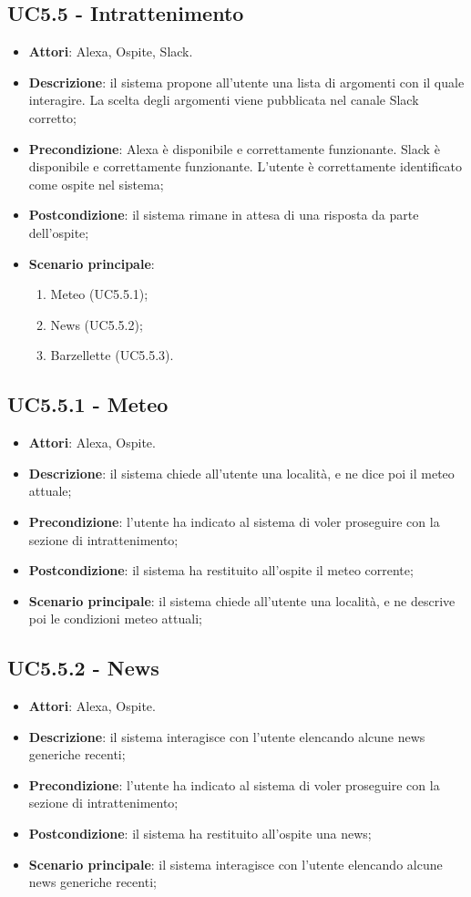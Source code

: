 \documentclass[../AnalisiDeiRequisiti_v3.0.0.tex]{subfiles}
\begin{document}
\subsection{UC5.5 - Intrattenimento} 
\label{sssec:UC5.5} 
\begin{itemize} 
\item \textbf{Attori}: Alexa, Ospite, Slack.
\item \textbf{Descrizione}: il sistema propone all'utente una lista di argomenti con il quale interagire. La scelta degli argomenti viene pubblicata nel canale Slack corretto;
\item \textbf{Precondizione}: Alexa è disponibile e correttamente funzionante. Slack è disponibile e correttamente funzionante. L'utente è correttamente identificato come ospite nel sistema;
\item \textbf{Postcondizione}: il sistema rimane in attesa di una risposta da parte dell'ospite;
\item \textbf{Scenario principale}: \begin{enumerate}\item Meteo (UC5.5.1);\item News (UC5.5.2);\item Barzellette (UC5.5.3). 
 \end{enumerate}
\end{itemize} 
\subsection{UC5.5.1 - Meteo} 
\label{sssec:UC5.5.1} 
\begin{itemize} 
\item \textbf{Attori}: Alexa, Ospite.
\item \textbf{Descrizione}: il sistema chiede all'utente una località, e ne dice poi il meteo attuale;
\item \textbf{Precondizione}: l'utente ha indicato al sistema di voler proseguire con la sezione di intrattenimento;
\item \textbf{Postcondizione}: il sistema ha restituito all'ospite il meteo corrente;
\item \textbf{Scenario principale}: il sistema chiede all'utente una località, e ne descrive poi le condizioni meteo attuali;
\end{itemize} 
\subsection{UC5.5.2 - News} 
\label{sssec:UC5.5.2} 
\begin{itemize} 
\item \textbf{Attori}: Alexa, Ospite.
\item \textbf{Descrizione}: il sistema interagisce con l'utente elencando alcune news generiche recenti;
\item \textbf{Precondizione}: l'utente ha indicato al sistema di voler proseguire con la sezione di intrattenimento;
\item \textbf{Postcondizione}: il sistema ha restituito all'ospite una news;
\item \textbf{Scenario principale}: il sistema interagisce con l'utente elencando alcune news generiche recenti;
\end{itemize} 
\end{document}
